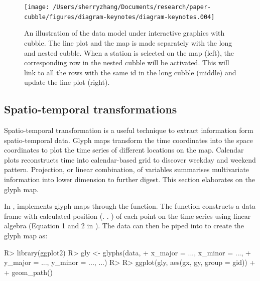 \documentclass[
]{jss}
\begin{document}
\begin{CodeChunk}
\begin{figure}

{\centering \texttt{[image: /Users/sherryzhang/Documents/research/paper-cubble/figures/diagram-keynotes/diagram-keynotes.004]} 

}

\caption[An illustration of the data model under interactive graphics with cubble]{An illustration of the data model under interactive graphics with cubble. The line plot and the map is made separately with the long and nested cubble. When a station is selected on the map (left), the corresponding row in the nested cubble will be activated. This will link to all the rows with the same id in the long cubble (middle) and update the line plot (right).}\label{fig:illu-interactive}
\end{figure}
\end{CodeChunk}

\hypertarget{st_transformation}{%
\subsection{Spatio-temporal transformations}\label{st_transformation}}

Spatio-temporal transformation is a useful technique to extract
information form spatio-temporal data. Glyph maps \citep{Wickham2012-yr}
transform the time coordinates into the space coordinates to plot the
time series of different locations on the map. Calendar plots
\citep{wang2020calendar} reconstructs time into calendar-based grid to
discover weekday and weekend pattern. Projection, or linear combination,
of variables summarises multivariate information into lower dimension to
further digest. This section elaborates on the glyph map.

In ,  implements glyph maps through the
 function. The function constructs a data frame with
calculated position (. . ) of each point on
the time series using linear algebra (Equation 1 and 2 in
\citet{Wickham2012-yr}). The data can then be piped into 
to create the glyph map as:

\begin{CodeChunk}
\begin{CodeInput}
R> library(ggplot2)
R> gly <- glyphs(data, 
+               x_major = ..., x_minor = ..., 
+               y_major = ..., y_minor = ..., ...)
R> 
R> ggplot(gly, aes(gx, gy, group = gid)) + 
+   geom_path() 
\end{CodeInput}
\end{CodeChunk}
\end{document}

